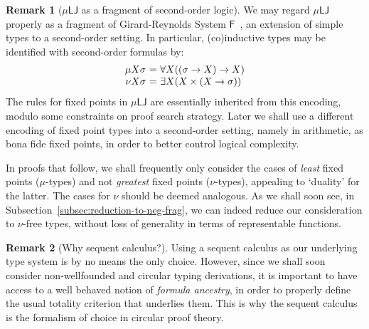 \documentclass[10pt,a4paper]{amsart}
\theoremstyle{plain}
\theoremstyle{definition}
\newtheorem{remark}[remark]{Remark}
\newcommand{\anupam}[1]{\todo[color=green]{A: #1}}
\renewcommand{\todo}[1]{}
\renewcommand{\anupam}[1]{}
\theoremstyle{plain}
\theoremstyle{definition} %
\newcommand{\arrow}{\to}
\newcommand{\LJ}{\mathsf{LJ}}
\newcommand{\F}{\mathsf{F}}
\newcommand{\muLJ}{\mu\LJ}
\begin{document}
\begin{remark}
    [$\muLJ$ as a fragment of second-order logic]
    \label{rem:mulj-frag-F}
    We may regard $\muLJ$ properly as a fragment of Girard-Reynolds System $\F$~\cite{girard1972systemF,Reynolds74systemF}, an extension of simple types to a second-order setting. 
    In particular, (co)inductive types may be identified with second-order formulas by:
    \[
    \begin{array}{r@{\ = \ }l}
         \mu X \sigma & \forall X ((\sigma \arrow X) \arrow X) \\
         \nu X \sigma & \exists X (X \times (X \arrow \sigma))
    \end{array}
    \]
    The rules for fixed points in $\muLJ$ are essentially inherited from this encoding, modulo some constraints on proof search strategy.
% 
    Later we shall use a different encoding of fixed point types into a second-order setting, namely in arithmetic, as bona fide fixed points, in order to better control logical complexity.\anupam{could say more}
\end{remark}

In proofs that follow, we shall frequently only consider the cases of \emph{least} fixed points ($\mu$-types) and not \emph{greatest} fixed points ($\nu$-types), 
appealing to `duality' for the latter.
The cases for $\nu$ should be deemed analogous.
As we shall soon see, in Subsection~\ref{subsec:reduction-to-neg-frag}, we can indeed reduce our consideration to $\nu$-free types, without loss of generality in terms of representable functions.

\begin{remark}
    [Why sequent calculus?]
    Using a sequent calculus as our underlying type system is by no means the only choice. 
    However, since we shall soon consider non-wellfounded and circular typing derivations, it is important to have access to a well behaved notion of \emph{formula ancestry}, in order to properly define the usual totality criterion that underlies them.
    This is why the sequent calculus is the formalism of choice in circular proof theory.
\end{remark}
\end{document}
